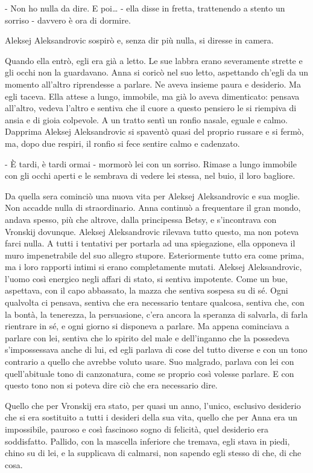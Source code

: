 - Non ho nulla da dire. E poi\ldots{} - ella disse in fretta, trattenendo a stento un sorriso - davvero è ora di dormire. 

Aleksej Aleksandrovic sospirò e, senza dir più nulla, si diresse in camera. 

Quando ella entrò, egli era già a letto. Le sue labbra erano severamente strette e gli occhi non la guardavano. Anna si coricò nel suo letto, aspettando ch'egli da un momento all'altro riprendesse a parlare. Ne aveva insieme paura e desiderio. Ma egli taceva. Ella attese a lungo, immobile, ma già lo aveva dimenticato: pensava all'altro, vedeva l'altro e sentiva che il cuore a questo pensiero le si riempiva di ansia e di gioia colpevole. A un tratto sentì un ronfio nasale, eguale e calmo. Dapprima Aleksej Aleksandrovic si spaventò quasi del proprio russare e si fermò, ma, dopo due respiri, il ronfio si fece sentire calmo e cadenzato. 

- È tardi, è tardi ormai - mormorò lei con un sorriso. Rimase a lungo immobile con gli occhi aperti e le sembrava di vedere lei stessa, nel buio, il loro bagliore. 

Da quella sera cominciò una nuova vita per Aleksej Aleksandrovic e sua moglie. Non accadde nulla di straordinario. Anna continuò a frequentare il gran mondo, andava spesso, più che altrove, dalla principessa Betsy, e s'incontrava con Vronskij dovunque. Aleksej Aleksandrovic rilevava tutto questo, ma non poteva farci nulla. A tutti i tentativi per portarla ad una spiegazione, ella opponeva il muro impenetrabile del suo allegro stupore. Esteriormente tutto era come prima, ma i loro rapporti intimi si erano completamente mutati. Aleksej Aleksandrovic, l'uomo così energico negli affari di stato, si sentiva impotente. Come un bue, aspettava, con il capo abbassato, la mazza che sentiva sospesa su di sé. Ogni qualvolta ci pensava, sentiva che era necessario tentare qualcosa, sentiva che, con la bontà, la tenerezza, la persuasione, c'era ancora la speranza di salvarla, di farla rientrare in sé, e ogni giorno si disponeva a parlare. Ma appena cominciava a parlare con lei, sentiva che lo spirito del male e dell'inganno che la possedeva s'impossessava anche di lui, ed egli parlava di cose del tutto diverse e con un tono contrario a quello che avrebbe voluto usare. Suo malgrado, parlava con lei con quell'abituale tono di canzonatura, come se proprio così volesse parlare. E con questo tono non si poteva dire ciò che era necessario dire. 

Quello che per Vronskij era stato, per quasi un anno, l'unico, esclusivo desiderio che si era sostituito a tutti i desideri della sua vita, quello che per Anna era un impossibile, pauroso e così fascinoso sogno di felicità, quel desiderio era soddisfatto. Pallido, con la mascella inferiore che tremava, egli stava in piedi, chino su di lei, e la supplicava di calmarsi, non sapendo egli stesso di che, di che cosa. 

